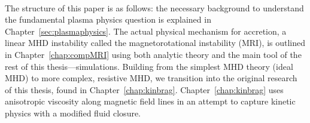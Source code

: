\\
The structure of this paper is as follows: the necessary background to understand the fundamental plasma physics question is explained in Chapter~\ref{sec:plasmaphysics}. The actual physical mechanism for accretion, a linear MHD instability called the magnetorotational instability (MRI), is outlined in Chapter~\ref{chap:compMRI} using both analytic theory and the main tool of the rest of this thesis---simulations. Building from the simplest MHD theory (ideal MHD) to more complex, resistive MHD, we transition into the original research of this thesis, found in Chapter~\ref{chap:kinbrag}. Chapter~\ref{chap:kinbrag} uses anisotropic viscosity along magnetic field lines in an attempt to capture kinetic physics with a modified fluid closure. 

